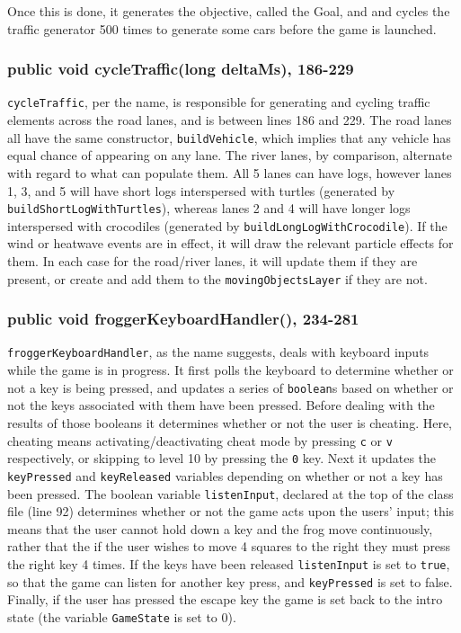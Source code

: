 \documentclass[12pt]{article}
\begin{document}
Once this is done, it generates the objective, called the Goal, and and cycles the traffic generator 500 times to generate some cars before the game is launched.

\subsubsection{public void cycleTraffic(long deltaMs), 186-229}
\verb|cycleTraffic|, per the name, is responsible for generating and cycling traffic elements across the road lanes, and is between lines 186 and 229.
The road lanes all have the same constructor, \verb|buildVehicle|, which implies that any vehicle has equal chance of appearing on any lane.
The river lanes, by comparison, alternate with regard to what can populate them.
All 5 lanes can have logs, however lanes 1, 3, and 5 will have short logs interspersed with turtles (generated by \verb|buildShortLogWithTurtles|), whereas lanes 2 and 4 will have longer logs interspersed with crocodiles (generated by \verb|buildLongLogWithCrocodile|).
If the wind or heatwave events are in effect, it will draw the relevant particle effects for them.
In each case for the road/river lanes, it will update them if they are present, or create and add them to the \verb|movingObjectsLayer| if they are not.

\subsubsection{public void froggerKeyboardHandler(), 234-281}
\verb|froggerKeyboardHandler|, as the name suggests, deals with keyboard inputs while the game is in progress.
It first polls the keyboard to determine whether or not a key is being pressed, and updates a series of \verb|boolean|s based on whether or not the keys associated with them have been pressed.
Before dealing with the results of those booleans it determines whether or not the user is cheating.
Here, cheating means activating/deactivating cheat mode by pressing \verb|c| or \verb|v| respectively, or skipping to level 10 by pressing the \verb|0| key.
Next it updates the \verb|keyPressed| and \verb|keyReleased| variables depending on whether or not a key has been pressed.
The boolean variable \verb|listenInput|, declared at the top of the class file (line 92) determines whether or not the game acts upon the users' input; this means that the user cannot hold down a key and the frog move continuously, rather that the if the user wishes to move 4 squares to the right they must press the right key 4 times.
If the keys have been released \verb|listenInput| is set to \verb|true|, so that the game can listen for another key press, and \verb|keyPressed| is set to false.
Finally, if the user has pressed the escape key the game is set back to the intro state (the variable \verb|GameState| is set to 0).
\end{document}
